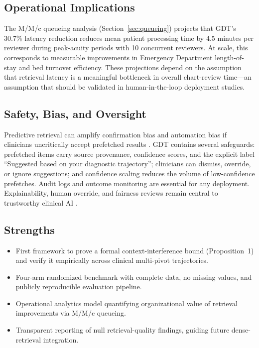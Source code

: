 \documentclass[11pt]{article}
\begin{document}
\subsection{Operational Implications}
The M/M/c queueing analysis (Section~\ref{sec:queueing}) projects that GDT's 30.7\% latency reduction reduces mean patient processing time by 4.5 minutes per reviewer during peak-acuity periods with 10 concurrent reviewers. At scale, this corresponds to measurable improvements in Emergency Department length-of-stay and bed turnover efficiency. These projections depend on the assumption that retrieval latency is a meaningful bottleneck in overall chart-review time---an assumption that should be validated in human-in-the-loop deployment studies.

\subsection{Safety, Bias, and Oversight}
Predictive retrieval can amplify confirmation bias and automation bias if clinicians uncritically accept prefetched results \citep{croskerry2003,goddard2012}. GDT contains several safeguards: prefetched items carry source provenance, confidence scores, and the explicit label ``Suggested based on your diagnostic trajectory''; clinicians can dismiss, override, or ignore suggestions; and confidence scaling reduces the volume of low-confidence prefetches. Audit logs and outcome monitoring are essential for any deployment. Explainability, human override, and fairness reviews remain central to trustworthy clinical AI \citep{lekadir25,amann20}.

\subsection{Strengths}
\begin{itemize}
  \item First framework to prove a formal context-interference bound (Proposition~1) and verify it empirically across clinical multi-pivot trajectories.
  \item Four-arm randomized benchmark with complete data, no missing values, and publicly reproducible evaluation pipeline.
  \item Operational analytics model quantifying organizational value of retrieval improvements via M/M/c queueing.
  \item Transparent reporting of null retrieval-quality findings, guiding future dense-retrieval integration.
\end{itemize}
\end{document}
